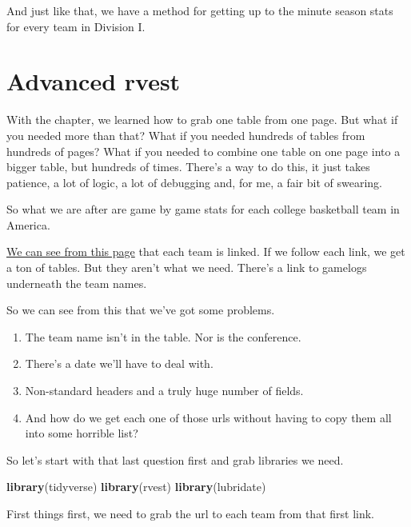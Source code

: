 \documentclass[]{book}
\newenvironment{Shaded}{\begin{snugshade}}{\end{snugshade}}
\newcommand{\KeywordTok}[1]{\textcolor[rgb]{0.13,0.29,0.53}{\textbf{#1}}}
\newcommand{\NormalTok}[1]{#1}
\providecommand{\tightlist}{%
  \setlength{\itemsep}{0pt}\setlength{\parskip}{0pt}}
\begin{document}
And just like that, we have a method for getting up to the minute season stats for every team in Division I.

\hypertarget{advanced-rvest}{%
\chapter{Advanced rvest}\label{advanced-rvest}}

With the chapter, we learned how to grab one table from one page. But what if you needed more than that? What if you needed hundreds of tables from hundreds of pages? What if you needed to combine one table on one page into a bigger table, but hundreds of times. There's a way to do this, it just takes patience, a lot of logic, a lot of debugging and, for me, a fair bit of swearing.

So what we are after are game by game stats for each college basketball team in America.

\href{https://www.sports-reference.com/cbb/seasons/2019-school-stats.html}{We can see from this page} that each team is linked. If we follow each link, we get a ton of tables. But they aren't what we need. There's a link to gamelogs underneath the team names.

So we can see from this that we've got some problems.

\begin{enumerate}
\def\labelenumi{\arabic{enumi}.}
\tightlist
\item
  The team name isn't in the table. Nor is the conference.
\item
  There's a date we'll have to deal with.
\item
  Non-standard headers and a truly huge number of fields.
\item
  And how do we get each one of those urls without having to copy them all into some horrible list?
\end{enumerate}

So let's start with that last question first and grab libraries we need.

\begin{Shaded}
\begin{Highlighting}[]
\KeywordTok{library}\NormalTok{(tidyverse)}
\KeywordTok{library}\NormalTok{(rvest)}
\KeywordTok{library}\NormalTok{(lubridate)}
\end{Highlighting}
\end{Shaded}

First things first, we need to grab the url to each team from that first link.
\end{document}
